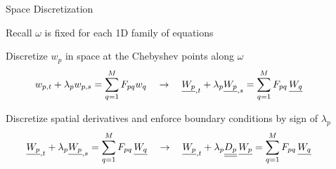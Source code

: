 \documentclass{beamer}
\newcommand{\bunderline}[1]{\underline{#1}}
\renewcommand{\vec}[1]{{\bunderline{#1}}}
\newcommand{\mat}[1]{{\bunderline{\bunderline{#1}}}}
\begin{document}

\begin{frame}{Space Discretization}
    \begin{itemize}
        {
        \item Recall $\omega$ is fixed for each 1D family of equations
        \item Discretize $w_{p}$ in space at the Chebyshev points along $\omega$
        \begin{align*}
            \hspace{-1cm} w_{p, t} + \lambda_{p} w_{p, s} = \sum_{q=1}^{M} F_{pq} w_{q} \quad \rightarrow \quad 
            \vec{W_{p}}_{, t} + \lambda_{p} \vec{W_{p}}_{, s} = \sum_{q=1}^{M} F_{pq} \, \vec{W_{q}}
        \end{align*}
        }
        {
        \item Discretize spatial derivatives and enforce boundary conditions by sign of $\lambda_{p}$
        \begin{align*}
            \hspace{-1cm} \vec{W_{p}}_{, t} + \lambda_{p} \vec{W_{p}}_{, s} = \sum_{q=1}^{M} F_{pq} \, \vec{W_{q}} \quad \rightarrow \quad
            \vec{W_{p}}_{, t} + \lambda_{p} \mat{D_{p}} \, \vec{W_{p}} = \sum_{q=1}^{M} F_{pq} \, \vec{W_{q}}
        \end{align*}
        }
    \end{itemize}
\end{frame}
\end{document}

